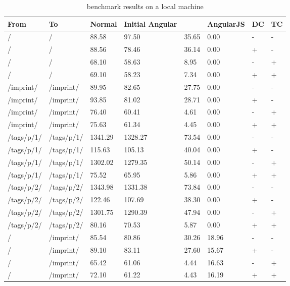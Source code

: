 \begin{appendix}
\subsubsection{\selenium{}}
\begin{center}
\footnotesize
\begin{longtable}{llllllll}
    \caption{\selenium{} benchmark results on a local machine}
    \\
	\hline
	\textbf{From} & \textbf{To} & \textbf{Normal} & \textbf{Initial Angular} & \textbf{\lare{}} & \textbf{AngularJS} &  \textbf{DC} & \textbf{TC} \\
\hline
/ & / & 88.58 & 97.50 & 35.65 & 0.00 & - & - \\
/ & / & 88.56 & 78.46 & 36.14 & 0.00 & + & - \\
/ & / & 68.10 & 58.63 & 8.95 & 0.00 & - & + \\
/ & / & 69.10 & 58.23 & 7.34 & 0.00 & + & + \\
\hline
/imprint/ & /imprint/ & 89.95 & 82.65 & 27.75 & 0.00 & - & - \\
/imprint/ & /imprint/ & 93.85 & 81.02 & 28.71 & 0.00 & + & - \\
/imprint/ & /imprint/ & 76.40 & 60.41 & 4.61 & 0.00 & - & + \\
/imprint/ & /imprint/ & 75.63 & 61.34 & 4.45 & 0.00 & + & + \\
\hline
/tags/p/1/ & /tags/p/1/ & 1341.29 & 1328.27 & 73.54 & 0.00 & - & - \\
/tags/p/1/ & /tags/p/1/ & 115.63 & 105.13 & 40.04 & 0.00 & + & - \\
/tags/p/1/ & /tags/p/1/ & 1302.02 & 1279.35 & 50.14 & 0.00 & - & + \\
/tags/p/1/ & /tags/p/1/ & 75.52 & 65.95 & 5.86 & 0.00 & + & + \\
\hline
/tags/p/2/ & /tags/p/2/ & 1343.98 & 1331.38 & 73.84 & 0.00 & - & - \\
/tags/p/2/ & /tags/p/2/ & 122.46 & 107.69 & 38.30 & 0.00 & + & - \\
/tags/p/2/ & /tags/p/2/ & 1301.75 & 1290.39 & 47.94 & 0.00 & - & + \\
/tags/p/2/ & /tags/p/2/ & 80.16 & 70.53 & 5.87 & 0.00 & + & + \\
\hline
\hline
/ & /imprint/ & 85.54 & 80.86 & 30.26 & 18.96 & - & - \\
/ & /imprint/ & 89.10 & 83.11 & 27.60 & 15.67 & + & - \\
/ & /imprint/ & 65.42 & 61.06 & 4.44 & 16.63 & - & + \\
/ & /imprint/ & 72.10 & 61.22 & 4.43 & 16.19 & + & + \\

\end{longtable}
\end{center}
\end{appendix}
